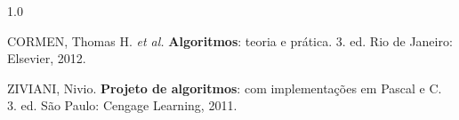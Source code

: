 
\begin{spacing}{1.0}

\noindent CORMEN, Thomas H. \textit{et al.} \textbf{Algoritmos}: teoria e
prática. 3. ed. Rio de Janeiro: Elsevier, 2012.

\vspace{\baselineskip}

\noindent ZIVIANI, Nivio. \textbf{Projeto de algoritmos}: com implementações em
Pascal e C. 3. ed. São Paulo: Cengage Learning, 2011.

\end{spacing}
